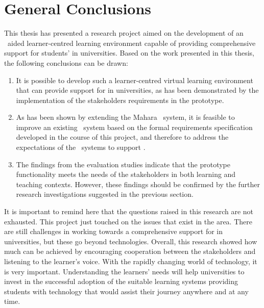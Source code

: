 \section{General Conclusions}

This thesis has presented a research project aimed on the development of an
\ep~aided learner-centred learning environment capable of providing
comprehensive support for students' \LLLs in universities. Based on the work
presented in this thesis, the following conclusions can be drawn:
\begin{enumerate}
  \item It is possible to develop such a learner-centred virtual learning
  environment that can provide support for \LLLs in universities, as has been
  demonstrated by the implementation of the stakeholders requirements in the
  prototype.
  \item As has been shown by extending the Mahara \ep~system, it is feasible to
  improve an existing \ep~system based on the formal requirements specification
  developed in the course of this project, and therefore to address the
  expectations of the \ep~systems to support \LLLsn.
  \item The findings from the evaluation studies indicate that the prototype
  functionality meets the needs of the stakeholders in both learning and
  teaching contexts. However, these findings should be confirmed by the further
  research investigations suggested in the previous section.
\end{enumerate}

It is important to remind here that the questions raised in this research are
not exhausted. This project just touched on the issues that exist in the area.
There are still challenges in working towards a comprehensive support for \LLLs in
universities, but these go beyond technologies. Overall, this research showed
how much can be achieved by encouraging cooperation between the stakeholders and
listening to the learner's voice. With the rapidly changing world of technology,
it is very important. Understanding the learners' needs will help universities
to invest in the successful adoption of the suitable learning systems providing
students with technology that would assist their \LLLs journey anywhere and at
any time.
